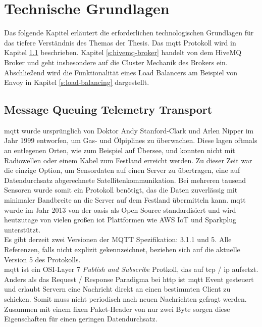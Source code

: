 \section{Technische Grundlagen} \label{s:basics}

Das folgende Kapitel erläutert die erforderlichen technologischen Grundlagen für das tiefere Verständnis des Themas der Thesis.
Das \acs{mqtt} Protokoll wird in Kapitel \ref{s:mqtt} beschrieben.
Kapitel \ref{s:hivemq-broker} handelt von dem HiveMQ Broker und geht insbesondere auf die Cluster Mechanik des Brokers ein.
Abschlie{\ss}end wird die Funktionalität eines Load Balancers am Beispiel von Envoy in Kapitel \ref{s:load-balancing} dargestellt.

\subsection{Message Queuing Telemetry Transport} \label{s:mqtt}
\acf{mqtt} wurde ursprünglich von Doktor Andy Stanford-Clark und Arlen Nipper im Jahr 1999 entworfen, um Gas- und Ölpiplines zu überwachen. Diese lagen oftmals an entlegenen Orten, wie zum Beispiel auf Übersee, und konnten nicht mit Radiowellen oder einem Kabel zum Festland erreicht werden. Zu dieser Zeit war die einzige Option, um Sensordaten auf einen Server zu übertragen, eine auf Datendurchsatz abgerechnete Satellitenkommunikation. Bei mehreren tausend Sensoren wurde somit ein Protokoll benötigt, das die Daten zuverlässig mit minimaler Bandbreite an die Server auf dem Festland übermitteln kann.
\ac{mqtt} wurde im Jahr 2013 von der \ac{oasis} als Open Source standardisiert und wird heutzutage von vielen gro{\ss}en \ac{iot} Plattformen wie AWS IoT und Sparkplug unterstützt.
\cite{WhatMQTTDefinition}\\
Es gibt derzeit zwei Versionen der MQTT Spezifikation: 3.1.1 und 5. Alle Referenzen, falls nicht explizit gekennzeichnet, beziehen sich auf die aktuelle Version 5 des Protokolls.\\
\ac{mqtt} ist ein OSI-Layer 7 \textit{Publish and Subscribe} Protkoll, das auf \acs{tcp} / \acs{ip} aufsetzt. Anders als das Request / Response Paradigma bei \acs{http} ist \ac{mqtt} Event gesteuert und erlaubt Servern eine Nachricht direkt an einen bestimmten Client zu schicken. Somit muss nicht periodisch nach neuen Nachrichten gefragt werden. Zusammen mit einem fixen Paket-Header von nur zwei Byte sorgen diese Eigenschaften für einen geringen Datendurchsatz.\cite{WhatMQTTDefinition}

